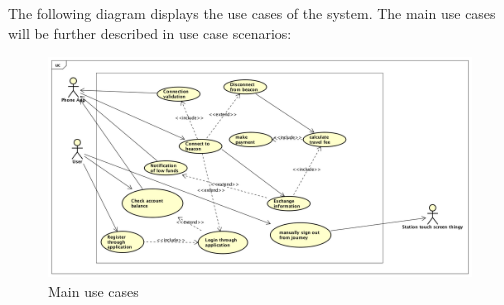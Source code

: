 The following diagram displays the use cases of the system. The main use cases will be further described in use case scenarios:

\begin{figure}[H]
	\centering
	\includegraphics[width=\textwidth]{Pictures/main_use_cases.png}
	\caption{Main use cases}
	\label{fig:main_use_cases}
\end{figure}

